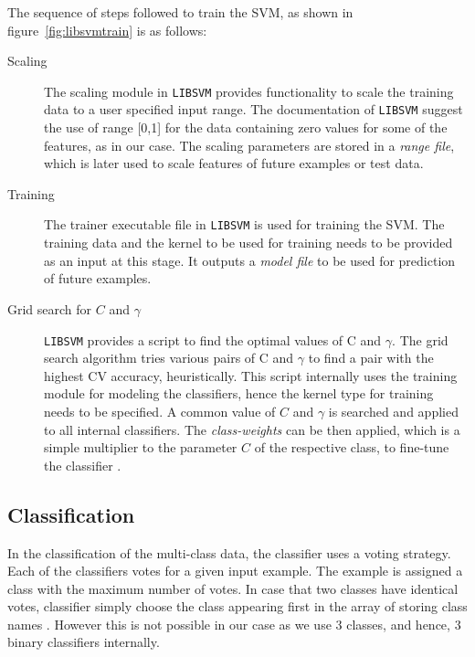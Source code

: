 The sequence of steps followed to train the SVM, as shown in figure~\ref{fig:libsvmtrain} is as follows:
\begin{description}

  \item[Scaling] The scaling module in \texttt{LIBSVM} provides functionality to scale the training data to a user specified input range. The documentation of \texttt{LIBSVM} \cite{Hsu2003} suggest the use of range [0,1] for the data containing zero values for some of the features, as in our case. The scaling parameters are stored in a \emph{range file}, which is later used to scale features of future examples or test data.

   \item[Training] The trainer executable file in \texttt{LIBSVM} is used for training the SVM. The training data and the kernel to be used for training needs to be provided as an input at this stage. It outputs a \emph{model file} to be used for prediction of future examples.

  \item[Grid search for $C$ and $\gamma$] \texttt{LIBSVM} provides a script to find the optimal values of C and $\gamma$. The grid search  algorithm tries various pairs of C and $\gamma$ to find a pair with the highest CV accuracy, heuristically. This script internally uses the training module for modeling the classifiers, hence the kernel type for training needs to be specified. A common value of $C$ and $\gamma$ is searched and applied to all internal classifiers. The \emph{class-weights} can be then applied, which is a simple multiplier to the parameter $C$ of the respective class, to fine-tune the classifier \cite{Chang2011}.
 
\end{description}

\subsection{Classification}

In the classification of the multi-class data, the classifier uses a voting strategy. Each of the classifiers votes for a given input example. The example is assigned a class with the maximum number of votes. In case that two classes have identical votes, classifier simply choose the class appearing first in the array of storing class names \cite{Chang2011}. However this is not possible in our case as we use 3 classes, and hence, 3 binary classifiers internally.

